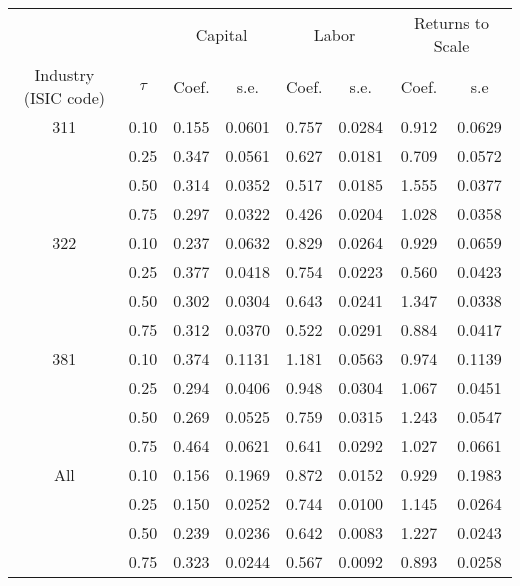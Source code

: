 \begin{table}[ht]
\centering
\begin{tabular}{cccccccc}
  \hline\hline & & \multicolumn{2}{c}{Capital}  & \multicolumn{2}{c}{Labor} & \multicolumn{2}{c}{Returns to Scale} \\ \cmidrule(lr){3-4} \cmidrule(lr){5-6} \cmidrule(lr){7-8}Industry (ISIC code) & $\tau$ & Coef. & s.e. & Coef. & s.e. & Coef. & s.e \\ 
  \hline
311 & 0.10 & 0.155 & 0.0601 & 0.757 & 0.0284 & 0.912 & 0.0629 \\ 
   & 0.25 & 0.347 & 0.0561 & 0.627 & 0.0181 & 0.709 & 0.0572 \\ 
   & 0.50 & 0.314 & 0.0352 & 0.517 & 0.0185 & 1.555 & 0.0377 \\ 
   & 0.75 & 0.297 & 0.0322 & 0.426 & 0.0204 & 1.028 & 0.0358 \\ 
  322 & 0.10 & 0.237 & 0.0632 & 0.829 & 0.0264 & 0.929 & 0.0659 \\ 
   & 0.25 & 0.377 & 0.0418 & 0.754 & 0.0223 & 0.560 & 0.0423 \\ 
   & 0.50 & 0.302 & 0.0304 & 0.643 & 0.0241 & 1.347 & 0.0338 \\ 
   & 0.75 & 0.312 & 0.0370 & 0.522 & 0.0291 & 0.884 & 0.0417 \\ 
  381 & 0.10 & 0.374 & 0.1131 & 1.181 & 0.0563 & 0.974 & 0.1139 \\ 
   & 0.25 & 0.294 & 0.0406 & 0.948 & 0.0304 & 1.067 & 0.0451 \\ 
   & 0.50 & 0.269 & 0.0525 & 0.759 & 0.0315 & 1.243 & 0.0547 \\ 
   & 0.75 & 0.464 & 0.0621 & 0.641 & 0.0292 & 1.027 & 0.0661 \\ 
  All & 0.10 & 0.156 & 0.1969 & 0.872 & 0.0152 & 0.929 & 0.1983 \\ 
   & 0.25 & 0.150 & 0.0252 & 0.744 & 0.0100 & 1.145 & 0.0264 \\ 
   & 0.50 & 0.239 & 0.0236 & 0.642 & 0.0083 & 1.227 & 0.0243 \\ 
   & 0.75 & 0.323 & 0.0244 & 0.567 & 0.0092 & 0.893 & 0.0258 \\ 
   \hline
\end{tabular}
\end{table}
